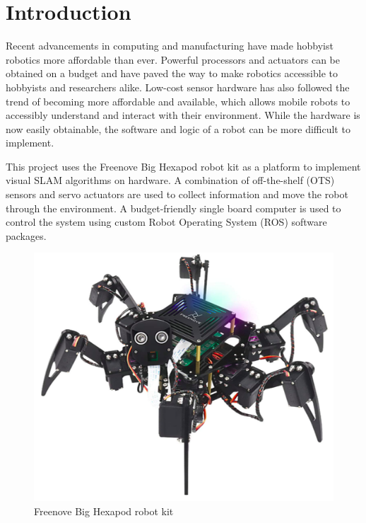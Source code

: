 \section{Introduction}

Recent advancements in computing and manufacturing have made hobbyist robotics more affordable than ever. Powerful processors and actuators can be obtained on a budget and have paved the way to make robotics accessible to hobbyists and researchers alike. Low-cost sensor hardware has also followed the trend of becoming more affordable and available, which allows mobile robots to accessibly understand and interact with their environment. While the hardware is now easily obtainable, the software and logic of a robot can be more difficult to implement.

This project uses the Freenove Big Hexapod robot kit as a platform to implement visual SLAM algorithms on hardware. A combination of off-the-shelf (OTS) sensors and servo actuators are used to collect information and move the robot through the environment. A budget-friendly single board computer is used to control the system using custom Robot Operating System (ROS) \cite{rosnoetic} software packages. 

\begin{figure}
    \centerline{\includegraphics[scale=0.5]{02_introduction/figures/hexapod1.png}}
    \caption{Freenove Big Hexapod robot kit}
\end{figure}